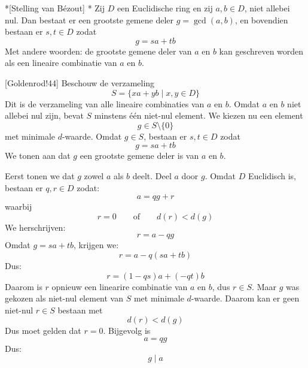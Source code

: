 \newpage
\begin{nicetheorem}*[Stelling van Bézout]
    \nextpart[]*
    Zij $D$ een Euclidische ring en zij $a,b\in D$, niet allebei nul. Dan bestaat er een grootste gemene deler $g=\gcd(a,b)$, en bovendien bestaan er $s,t\in D$ zodat
    \begin{equation*}
        g = sa + tb
    \end{equation*}
    Met andere woorden: de grootste gemene deler van $a$ en $b$ kan geschreven worden als een lineaire combinatie van $a$ en $b$.
\end{nicetheorem}

[Goldenrod!44] Beschouw de verzameling
\begin{equation*}
    S = \{xa + yb \mid x,y \in D\}
\end{equation*}
Dit is de verzameling van alle lineaire combinaties van $a$ en $b$. Omdat $a$ en $b$ niet allebei nul zijn, bevat $S$ minstens één niet-nul element. We kiezen nu een element
\begin{equation*}
    g \in S \setminus\{0\}
\end{equation*}
met minimale $d$-waarde. Omdat $g \in S$, bestaan er $s,t \in D$ zodat
\begin{equation*}
    g = sa + tb
\end{equation*}
We tonen aan dat $g$ een grootste gemene deler is van $a$ en $b$.

Eerst tonen we dat $g$ zowel $a$ als $b$ deelt. Deel $a$ door $g$. Omdat $D$ Euclidisch is, bestaan er $q,r \in D$ zodat:
\begin{equation*}
    a = qg + r
\end{equation*}
waarbij
\begin{equation*}
    r = 0 \qquad \text{of} \qquad d(r) < d(g)
\end{equation*}
We herschrijven:
\begin{equation*}
    r = a - qg
\end{equation*}
Omdat $g = sa + tb$, krijgen we:
\begin{equation*}
    r = a - q(sa + tb)
\end{equation*}
Dus:
\begin{equation*}
    r = (1-qs)a + (-qt)b
\end{equation*}
Daarom is $r$ opnieuw een linearire combinatie van $a$ en $b$, dus $r \in S$. Maar $g$ was gekozen als niet-nul element van $S$ met minimale $d$-waarde. Daarom kan er geen niet-nul $r\in S$ bestaan met
\begin{equation*}
    d(r) < d(g)
\end{equation*}
Dus moet gelden dat $r=0$. Bijgevolg is
\begin{equation*}
    a = qg
\end{equation*}
Dus:
\begin{equation*}
    g \mid a
\end{equation*}

